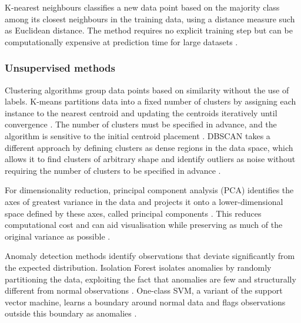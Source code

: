 K-nearest neighbours classifies a new data point based on the 
majority class among its closest neighbours in the training data, 
using a distance measure such as Euclidean distance. The method 
requires no explicit training step but can be computationally 
expensive at prediction time for large datasets 
\parencite{cunningham2021k_nearest_neighbour_classifiers_tutorial,
sarker2021machine_learning_algorithms_real_world_applications_research_directions}.

\subsubsection*{Unsupervised methods}

Clustering algorithms group data points based on similarity without 
the use of labels. K-means partitions data into a fixed number of 
clusters by assigning each instance to the nearest centroid and 
updating the centroids iteratively until convergence 
\parencite[Chapter~9]{geron2019hands_on_machine_learning}. 
The number of clusters must be specified in advance, and the 
algorithm is sensitive to the initial centroid placement 
\parencite[Chapter~9]{geron2019hands_on_machine_learning}. 
DBSCAN takes a different approach by defining clusters as dense 
regions in the data space, which allows it to find clusters of 
arbitrary shape and identify outliers as noise without requiring 
the number of clusters to be specified in advance 
\parencite{ester1996dbscan,
sarker2021machine_learning_algorithms_real_world_applications_research_directions}.

For dimensionality reduction, principal component analysis (PCA) 
identifies the axes of greatest variance in the data and projects 
it onto a lower-dimensional space defined by these axes, called 
principal components 
\parencite{hotelling1932pca,
geron2019hands_on_machine_learning}. 
This reduces computational cost and can aid visualisation while 
preserving as much of the original variance as possible 
\parencite[Chapter~8]{geron2019hands_on_machine_learning,
sarker2021machine_learning_algorithms_real_world_applications_research_directions}.

Anomaly detection methods identify observations that deviate 
significantly from the expected distribution. Isolation Forest 
isolates anomalies by randomly partitioning the data, exploiting 
the fact that anomalies are few and structurally different from 
normal observations 
\parencite{liu2008isolation_forest}. 
One-class SVM, a variant of the support vector machine, learns a 
boundary around normal data and flags observations outside this 
boundary as anomalies 
\parencite[Chapter~9]{geron2019hands_on_machine_learning}.

